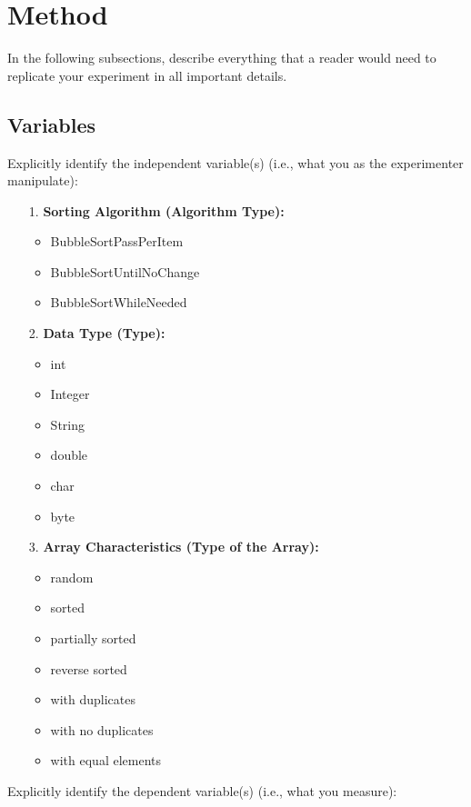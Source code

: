 \documentclass{article}
\begin{document}
\section{Method}
In the following subsections, describe everything that a reader would need to replicate your experiment in all important details.
\subsection{Variables}
Explicitly identify the independent variable(s) (i.e., what you as the experimenter manipulate): 

    \begin{tcolorbox}[title=Independent Variable:, colback=white, colframe=black, arc=0pt, outer arc=0pt]
        \begin{itemize}
         \item[1.] \textbf{Sorting Algorithm (Algorithm Type):}
            \begin{itemize}
            \item BubbleSortPassPerItem
            \item BubbleSortUntilNoChange
            \item BubbleSortWhileNeeded
            \end{itemize}
        \item[2.] \textbf{Data Type (Type):}
            \begin{itemize}
            \item int
            \item Integer
            \item String
            \item double
            \item char
            \item byte
            \end{itemize}
        \item[3.] \textbf{Array Characteristics (Type of the Array):}
            \begin{itemize}
            \item random
            \item sorted
            \item partially sorted
            \item reverse sorted
            \item with duplicates
            \item with no duplicates
            \item with equal elements
            \end{itemize}
        \end{itemize}

    \end{tcolorbox}
Explicitly identify the dependent variable(s) (i.e., what you measure):\\
\end{document}
